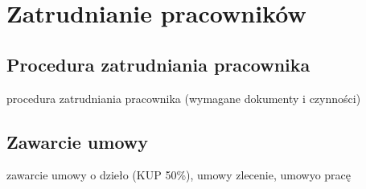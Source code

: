 \section{Zatrudnianie pracowników}
\subsection{Procedura zatrudniania pracownika}
procedura zatrudniania pracownika (wymagane dokumenty i czynności)
\subsection{Zawarcie umowy}
zawarcie umowy o dzieło (KUP 50\%), umowy zlecenie, umowyo pracę